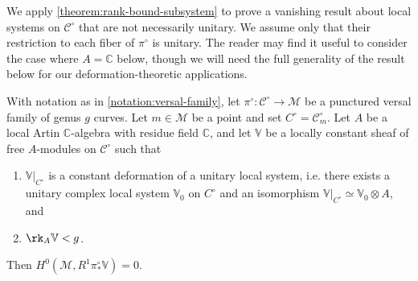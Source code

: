 We apply \autoref{theorem:rank-bound-subsystem} to prove a vanishing result about local systems on $\mathscr{C}^\circ$ that are not necessarily unitary. We assume only that their restriction to each fiber of $\pi^\circ$ is unitary. The reader may find it useful to consider the case where $A=\mathbb{C}$ below, though we will need the full generality of the result below for our deformation-theoretic applications.
\begin{theorem}
\notready
	\label{theorem:unitary-rigid}
	With notation as in \autoref{notation:versal-family},
	let $\pi^\circ: \mathscr{C}^\circ\to \mathscr{M}$ be a punctured versal
	family of genus $g$ curves. Let $m\in \mathscr{M}$ be a point and set $C^\circ
	= \mathscr C^\circ_m$. Let $A$ be a local Artin $\mathbb{C}$-algebra with residue field $\mathbb{C}$, and let $\mathbb V$ be a locally constant sheaf of free $A$-modules on $\mathscr C^\circ$
	such that
	\begin{enumerate}
 \item $\mathbb V|_{C^\circ}$ is a constant deformation of a unitary local system, i.e. there exists a unitary complex local system $\mathbb{V}_0$ on $C^\circ$ and an isomorphism $\mathbb V|_{C^\circ}\simeq \mathbb{V}_0\otimes A$, and
\item $\rk_A \mathbb V < g$.
		\end{enumerate}
 Then
	$H^0(\mathscr M, R^1 \pi^\circ_* \mathbb V) = 0$.
\end{theorem}
